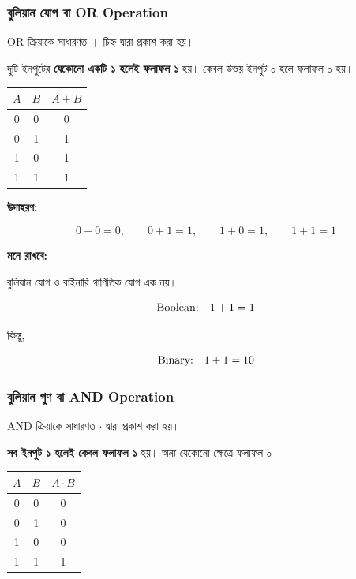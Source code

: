 \subsubsection*{বুলিয়ান যোগ বা \textenglish{OR Operation}}

\textenglish{OR} ক্রিয়াকে সাধারণত \(+\) চিহ্ন দ্বারা প্রকাশ করা হয়।

দুটি ইনপুটের \textbf{যেকোনো একটি ১ হলেই ফলাফল ১} হয়।
কেবল উভয় ইনপুট ০ হলে ফলাফল ০ হয়।

\begin{center}
\begin{tabular}{|c|c|c|}
\hline
\rowcolor{ICTLightBlue}
\(A\) & \(B\) & \(A+B\) \\
\hline
0 & 0 & 0 \\
\hline
0 & 1 & 1 \\
\hline
1 & 0 & 1 \\
\hline
1 & 1 & 1 \\
\hline
\end{tabular}
\end{center}

\textbf{\textcolor{ICTOrange}{উদাহরণ:}}

\[
0+0=0,\qquad
0+1=1,\qquad
1+0=1,\qquad
1+1=1
\]

\par\begingroup

\textbf{মনে রাখবে:}

বুলিয়ান যোগ ও বাইনারি গাণিতিক যোগ এক নয়।

\[
\text{\textenglish{Boolean:}}\quad 1+1=1
\]

কিন্তু,

\[
\text{\textenglish{Binary:}}\quad 1+1=10
\]
\par\endgroup



\subsubsection*{বুলিয়ান গুণ বা \textenglish{AND Operation}}

\textenglish{AND} ক্রিয়াকে সাধারণত \(\cdot\) দ্বারা প্রকাশ করা হয়।

\textbf{সব ইনপুট ১ হলেই কেবল ফলাফল ১} হয়।
অন্য যেকোনো ক্ষেত্রে ফলাফল ০।

\begin{center}
\begin{tabular}{|c|c|c|}
\hline
\rowcolor{ICTLightBlue}
\(A\) & \(B\) & \(A\cdot B\) \\
\hline
0 & 0 & 0 \\
\hline
0 & 1 & 0 \\
\hline
1 & 0 & 0 \\
\hline
1 & 1 & 1 \\
\hline
\end{tabular}
\end{center}


